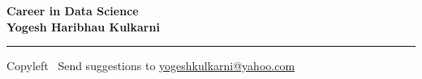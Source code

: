 
\graphicspath{{images/}}

\footnotesize


\begin{center}
\Large{\textbf{Career in Data Science\\ Yogesh Haribhau Kulkarni}}  
\end{center}

\begin{multicols}{2}


\end{multicols}

\rule{\linewidth}{0.25pt}
\scriptsize
Copyleft \textcopyleft\  Send suggestions to 
\href{http://www.yogeshkulkarni.com}{yogeshkulkarni@yahoo.com}


